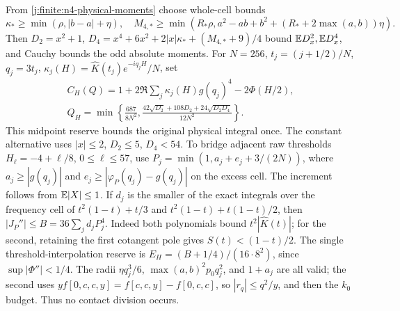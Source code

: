 From \eqref{j:finite:n4-physical-moments} choose whole-cell bounds
\[
 \kappa_*\ge\min(\rho,|b-a|+\eta),\quad
 M_{4,*}\ge\min(R_*\rho,a^2-ab+b^2+(R_*+2\max(a,b))\eta).
\]
Then $D_2=x^2+1$, $D_4=x^4+6x^2+2|x|\kappa_*+(M_{4,*}+9)/4$
bound $\mathbb E D_x^2,\mathbb E D_x^4$, and Cauchy bounds the odd absolute moments.
For $N=256$, $t_j=(j+1/2)/N$, $q_j=3t_j$,
$\kappa_j(H)=\widehat K(t_j)e^{-iq_jH}/N$, set
\begin{gather*}
 C_H(Q)=1+2\Re\sum_j\kappa_j(H)g(q_j)^4-2\Phi(H/2),\\
 Q_H=\min\left\{\frac{687}{8N^2},
 \frac{42\sqrt{D_2}+108D_2+24\sqrt{D_2D_4}}{12N^2}\right\}.
\end{gather*}
This midpoint reserve bounds the original physical integral once.
The constant alternative uses $|x|\le2$, $D_2\le5$, $D_4<54$.
To bridge adjacent raw thresholds $H_\ell=-4+\ell/8$,
$0\le\ell\le57$, use
$P_j=\min(1,a_j+e_j+3/(2N))$, where $a_j\ge|g(q_j)|$ and
$e_j\ge|\varphi_P(q_j)-g(q_j)|$ on the excess cell.
The increment follows from $\mathbb E|X|\le1$.
If $d_j$ is the smaller of the exact integrals over the frequency cell of
$t^2(1-t)+t/3$ and $t^2(1-t)+t(1-t)/2$, then
$|J_P''|\le B=36\sum_jd_jP_j^4$.
Indeed both polynomials bound $t^2|\widehat K(t)|$; for the second,
retaining the first cotangent pole gives $S(t)<(1-t)/2$.
The single threshold-interpolation reserve is
$E_H=(B+1/4)/(16\cdot8^2)$, since $\sup|\Phi''|<1/4$.
The radii $\eta q_j^3/6$, $\max(a,b)^2p_0q_j^2$, and $1+a_j$
are all valid; the second uses
$y f[0,c,c,y]=f[c,c,y]-f[0,c,c]$, so $|r_q|\le q^2/y$, and
then the $k_0$ budget. Thus no contact division occurs.

